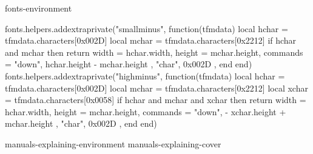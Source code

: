 
\startenvironment fonts-environment


    \blockligatures[fi,fl,ff]

    \startbuffer[extraminus]
    \startluacode
        fonts.helpers.addextraprivate("smallminus", function(tfmdata)
            local hchar = tfmdata.characters[0x002D]
            local mchar = tfmdata.characters[0x2212]
            if hchar and mchar then
                return {
                    width    = hchar.width,
                    height   = mchar.height,
                    commands = {
                        { "down", hchar.height - mchar.height },
                        { "char", 0x002D },
                    }
                }
            end
        end)
        fonts.helpers.addextraprivate("highminus", function(tfmdata)
            local hchar = tfmdata.characters[0x002D]
            local mchar = tfmdata.characters[0x2212]
            local xchar = tfmdata.characters[0x0058]
            if hchar and mchar and xchar then
                return {
                    width    = hchar.width,
                    height   = mchar.height,
                    commands = {
                        { "down", - xchar.height + mchar.height },
                        { "char", 0x002D },
                    }
                }
            end
        end)
    \stopluacode
    \stopbuffer

    \getbuffer[extraminus]


    \environment manuals-explaining-environment
    \environment manuals-explaining-cover

    \enabledirectives[visualizers.fraction=2]






\stopenvironment
